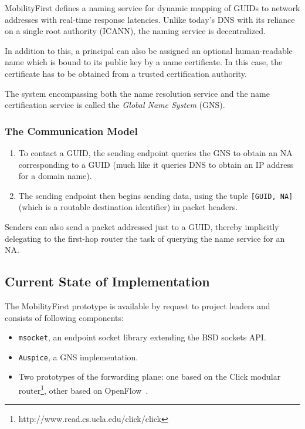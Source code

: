                MobilityFirst defines a naming service for dynamic mapping of GUIDs to network addresses with real-time response latencies. Unlike today's DNS with its reliance on a single root authority (ICANN), the naming service is decentralized.

                In addition to this, a principal can also be assigned an optional human-readable name which is bound to its public key by a name certificate. In this case, the certificate has to be obtained from a trusted certification authority.

                The system encompassing both the name resolution service and the name certification service is called the \emph{Global Name System} (GNS).

            \subsubsection{The Communication Model}

                \begin{enumerate}
                    \item To contact a GUID, the sending endpoint queries the GNS to obtain an NA corresponding to a GUID (much like it queries DNS to obtain an IP address for a domain name).
                    \item The sending endpoint then begins sending data, using the tuple \texttt{[GUID, NA]} (which is a routable destination identifier) in packet headers.
                \end{enumerate}

                Senders can also send a packet addressed just to a GUID, thereby implicitly delegating to the first-hop router the task of querying the name service for an NA.

        \subsection{Current State of Implementation}

            The MobilityFirst prototype is available by request to project leaders and consists of following components:

            \begin{itemize}
                \item \texttt{msocket}, an endpoint socket library extending the BSD sockets API.
                \item \texttt{Auspice}, a GNS implementation.
                \item Two prototypes of the forwarding plane: one based on the Click modular router\footnote{http://www.read.cs.ucla.edu/click/click}, other based on OpenFlow~\cite{openflow}.
            \end{itemize}


